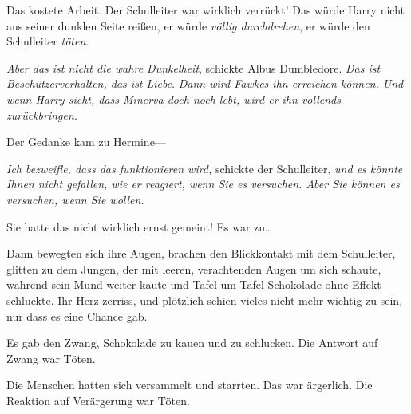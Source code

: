 Das kostete Arbeit. Der Schulleiter war wirklich verrückt! Das würde Harry nicht aus seiner dunklen Seite reißen, er würde \emph{völlig durchdrehen}, er würde den Schulleiter \emph{töten}.

\emph{Aber das ist nicht die wahre Dunkelheit}, schickte Albus Dumbledore. \emph{Das ist Beschützerverhalten, das ist Liebe}. \emph{Dann wird Fawkes ihn erreichen können. Und wenn Harry sieht, dass Minerva doch noch lebt, wird er ihn vollends zurückbringen.}

Der Gedanke kam zu Hermine—

\emph{Ich bezweifle, dass das funktionieren wird,} schickte der Schulleiter, \emph{und es könnte Ihnen nicht gefallen, wie er reagiert, wenn Sie es versuchen. Aber Sie können es versuchen, wenn Sie wollen.}

Sie hatte das nicht wirklich ernst gemeint! Es war zu…

Dann bewegten sich ihre Augen, brachen den Blickkontakt mit dem Schulleiter, glitten zu dem Jungen, der mit leeren, verachtenden Augen um sich schaute, während sein Mund weiter kaute und Tafel um Tafel Schokolade ohne Effekt schluckte.
Ihr Herz zerriss, und plötzlich schien vieles nicht mehr wichtig zu sein, nur dass es eine Chance gab.

\later

Es gab den Zwang, Schokolade zu kauen und zu schlucken. Die Antwort auf Zwang war Töten.

Die Menschen hatten sich versammelt und starrten. Das war ärgerlich. Die Reaktion auf Verärgerung war Töten.

